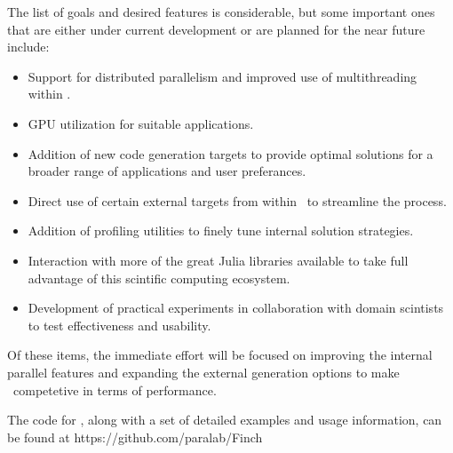 \documentclass[twoside,leqno,twocolumn]{article}
\begin{document}
The list of goals and desired features is considerable, but some important ones that are either under current development or are planned for the near future include:\\
\begin{itemize}
\item Support for distributed parallelism and improved use of multithreading within \FMshop.
\item GPU utilization for suitable applications.
\item Addition of new code generation targets to provide optimal solutions for a broader range of applications and user preferances.
\item Direct use of certain external targets from within \FMshop\ to streamline the process.
\item Addition of profiling utilities to finely tune internal solution strategies.
\item Interaction with more of the great Julia libraries available to take full advantage of this scintific computing ecosystem.
\item Development of practical experiments in collaboration with domain scintists to test effectiveness and usability.
\end{itemize}

Of these items, the immediate effort will be focused on improving the internal parallel features and expanding the external generation options to make \FMshop\ competetive in terms of performance. 

The code for \FMshop, along with a set of detailed examples and usage information, can be found at https://github.com/paralab/Finch
\end{document}
